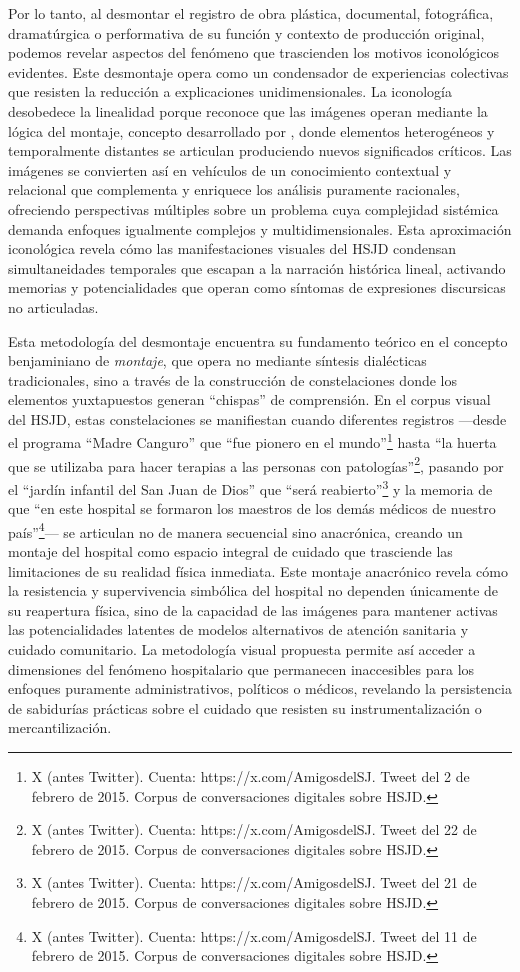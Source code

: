 \textcolor{edit30sept}{Por lo tanto, al desmontar el registro de obra plástica, documental, fotográfica, dramatúrgica o performativa de su función y contexto de producción original, podemos revelar aspectos del fenómeno que trascienden los motivos iconológicos evidentes. Este desmontaje opera como un condensador de experiencias colectivas que resisten la reducción a explicaciones unidimensionales. La iconología desobedece la linealidad porque reconoce que las imágenes operan mediante la lógica del montaje, concepto desarrollado por \cite{Benjamin2004}, donde elementos heterogéneos y temporalmente distantes se articulan produciendo nuevos significados críticos. Las imágenes se convierten así en vehículos de un conocimiento contextual y relacional que complementa y enriquece los análisis puramente racionales, ofreciendo perspectivas múltiples sobre un problema cuya complejidad sistémica demanda enfoques igualmente complejos y multidimensionales. Esta aproximación iconológica revela cómo las manifestaciones visuales del HSJD condensan simultaneidades temporales que escapan a la narración histórica lineal, activando memorias y potencialidades que operan como síntomas de expresiones discursicas no articuladas.}

Esta metodología del desmontaje encuentra su fundamento teórico en el concepto benjaminiano de \textit{montaje}, que opera no mediante síntesis dialécticas tradicionales, sino a través de la construcción de constelaciones donde los elementos yuxtapuestos generan ``chispas'' de comprensión. En el corpus visual del HSJD, estas constelaciones se manifiestan cuando diferentes registros —desde el programa ``Madre Canguro'' que ``fue pionero en el mundo''\footnote{X (antes Twitter). Cuenta: https://x.com/AmigosdelSJ. Tweet del 2 de febrero de 2015. Corpus de conversaciones digitales sobre HSJD.} hasta ``la huerta que se utilizaba para hacer terapias a las personas con patologías''\footnote{X (antes Twitter). Cuenta: https://x.com/AmigosdelSJ. Tweet del 22 de febrero de 2015. Corpus de conversaciones digitales sobre HSJD.}, pasando por el ``jardín infantil del San Juan de Dios'' que ``será reabierto''\footnote{X (antes Twitter). Cuenta: https://x.com/AmigosdelSJ. Tweet del 21 de febrero de 2015. Corpus de conversaciones digitales sobre HSJD.} y la memoria de que ``en este hospital se formaron los maestros de los demás médicos de nuestro país''\footnote{X (antes Twitter). Cuenta: https://x.com/AmigosdelSJ. Tweet del 11 de febrero de 2015. Corpus de conversaciones digitales sobre HSJD.}— se articulan no de manera secuencial sino anacrónica, creando un montaje del hospital como espacio integral de cuidado que trasciende las limitaciones de su realidad física inmediata. Este montaje anacrónico revela cómo la resistencia y supervivencia simbólica del hospital no dependen únicamente de su reapertura física, sino de la capacidad de las imágenes para mantener activas las potencialidades latentes de modelos alternativos de atención sanitaria y cuidado comunitario. La metodología visual propuesta permite así acceder a dimensiones del fenómeno hospitalario que permanecen inaccesibles para los enfoques puramente administrativos, políticos o médicos, revelando la persistencia de sabidurías prácticas sobre el cuidado que resisten su instrumentalización o mercantilización.

